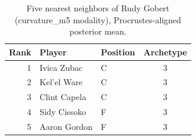 \begin{table}[htbp]
  \centering\small
  \begin{tabular}{rllc}
    \toprule
    Rank & Player & Position & Archetype \\
    \midrule
    1 & Ivica Zubac & C & 3 \\
    2 & Kel'el Ware & C & 3 \\
    3 & Clint Capela & C & 3 \\
    4 & Sidy Cissoko & F & 3 \\
    5 & Aaron Gordon & F & 3 \\
    \bottomrule
  \end{tabular}
  \caption{Five nearest neighbors of Rudy Gobert (curvature_m5 modality), Procrustes-aligned posterior mean.}
  \label{tab:Rudy_Gobert_neighbors_curvature_m5}
\end{table}

